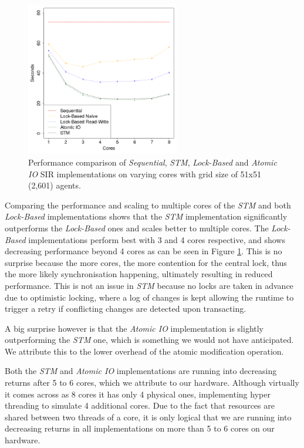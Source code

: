 \begin{figure}
	\centering
	\includegraphics[width=0.6\textwidth, angle=0]{./fig/concurrentabs/sir/sir_varyingcores_constgrid.png}
	\caption{Performance comparison of \textit{Sequential}, \textit{STM}, \textit{Lock-Based} and \textit{Atomic IO} SIR implementations on varying cores with grid size of 51x51 (2,601) agents.}
	\label{fig:sir_varyingcores_constgrid}
\end{figure}

Comparing the performance and scaling to multiple cores of the \textit{STM} and both \textit{Lock-Based} implementations shows that the \textit{STM} implementation significantly outperforms the \textit{Lock-Based} ones and scales better to multiple cores. The \textit{Lock-Based} implementations perform best with 3 and 4 cores respective, and shows decreasing performance beyond 4 cores as can be seen in Figure \ref{fig:sir_varyingcores_constgrid}. This is no surprise because the more cores, the more contention for the central lock, thus the more likely synchronisation happening, ultimately resulting in reduced performance. This is not an issue in \textit{STM} because no locks are taken in advance due to optimistic locking, where a log of changes is kept allowing the runtime to trigger a retry if conflicting changes are detected upon transacting. 

A big surprise however is that the \textit{Atomic IO} implementation is slightly outperforming the \textit{STM} one, which is something we would not have anticipated. We attribute this to the lower overhead of the atomic modification operation.

Both the \textit{STM} and \textit{Atomic IO} implementations are running into decreasing returns after 5 to 6 cores, which we attribute to our hardware. Although virtually it comes across as 8 cores it has only 4 physical ones, implementing hyper threading to simulate 4 additional cores. Due to the fact that resources are shared between two threads of a core, it is only logical that we are running into decreasing returns in all implementations on more than 5 to 6 cores on our hardware.

